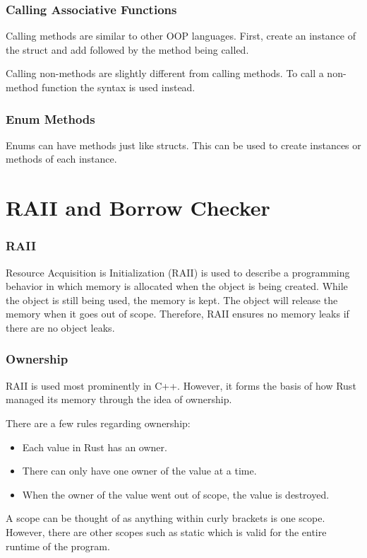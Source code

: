\documentclass{beamer}
\begin{document}
\begin{frame}[allowframebreaks]
  \frametitle{Calling Associative Functions}
  Calling methods are similar to other OOP languages. First, create an instance of the struct and add  followed by the method being called.
  

  \pagebreak

  Calling non-methods are slightly different from calling methods. To call a non-method function the \inlinecode{::} syntax is used instead.
  
\end{frame}

\begin{frame}[fragile]
  \frametitle{Enum Methods}
  Enums can have methods just like structs. This can be used to create instances or methods of each instance.

  
\end{frame}

\section{RAII and Borrow Checker}
\begin{frame}
  \frametitle{RAII}
  Resource Acquisition is Initialization (RAII) is used to describe a programming behavior in which memory is allocated when the object is being created. While the object is still being used, the memory is kept. The object will release the memory when it goes out of scope. Therefore, RAII ensures no memory leaks if there are no object leaks.
\end{frame}

\begin{frame}
  \frametitle{Ownership}
  RAII is used most prominently in C++. However, it forms the basis of how Rust managed its memory through the idea of ownership.

  There are a few rules regarding ownership:
  \begin{itemize}
    \item Each value in Rust has an owner.
    \item There can only have \alert{one} owner of the value at a time.
    \item When the owner of the value went out of scope, the value is destroyed.
  \end{itemize}

  A scope can be thought of as anything within curly brackets is one scope. However, there are other scopes such as static which is valid for the entire runtime of the program.
\end{frame}
\end{document}
